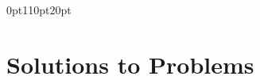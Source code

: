 \documentclass[letterpaper,11pt]{book}
\newif\ifshowbackmatter
\begin{document}
\begingroup{}
\renewcommand{\cleardoublepage}{}
\renewcommand{\clearpage}{}

\addnewlinetotoc{}

\newpage{}
\endgroup{}

\fi  %



\ifshowbackmatter


% 

\backmatter{}

\titleformat{\chapter}[display]
{\normalfont\huge\bfseries\sffamily}{}{25pt}{\chaptitlenonumber}
\titlespacing*{\chapter} {0pt}{110pt}{20pt}


\addnewlinetotoc{}
\clearpage{}


\chapter[\bf Solutions to Problems]{Solutions to Problems}

\setcounter{chapter}{16}
\renewcommand{\thefigure}{\Alph{chapter}.\arabic{figure}}



\clearpage

\end{document}
